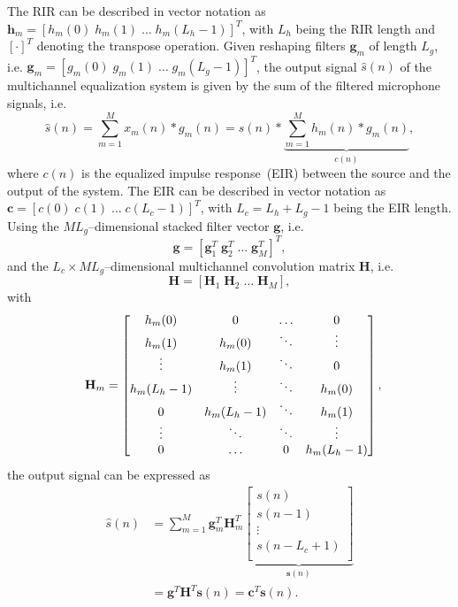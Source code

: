 \documentclass[10pt]{IEEEtran}
\begin{document}
The RIR can be described in vector notation as $\mathbf{h}_m = \left[h_m(0) \; h_m(1) \; \ldots \; h_m(L_h-1) \right]^T$, with $L_h$ being the RIR length and $\left[\cdot \right]^T$ denoting the transpose operation.
Given reshaping filters $\mathbf{g}_m$ of length $L_g$, i.e. $\mathbf{g}_m = \left[g_m(0) \; g_m(1) \; \ldots \; g_m(L_g-1) \right]^T$, the output signal $\hat{s}(n)$ of the multichannel equalization system is given by the sum of the filtered microphone signals, i.e.
\begin{equation}
  \hat{s}(n) = \sum_{m=1}^{M} x_m(n) \ast g_m(n) = s(n) \ast \underbrace{\sum_{m=1}^{M} h_m(n) \ast g_m(n)}_{c(n)},
\end{equation}
where $c(n)$ is the equalized impulse response~(EIR) between the source and the output of the system.
The EIR can be described in vector notation as $\mathbf{c} = \left[c(0) \; c(1) \; \ldots \; c(L_c-1) \right]^{T}$, with $L_c = L_h+L_g-1$ being the EIR length.
Using the $ML_g$--dimensional stacked filter vector $\mathbf{g}$, i.e.
\begin{equation}
  \mathbf{g}  =  \left[\mathbf{g}_1^T \; \mathbf{g}_2^T \; \ldots \; \mathbf{g}_M^T \right]^T,
\end{equation}
 and the $L_c \times ML_g$--dimensional multichannel convolution matrix $\mathbf{H}$, i.e.
\begin{equation}
\mathbf{H}  = \left[\mathbf{H}_1 \; \mathbf{H}_2 \; \ldots \; \mathbf{H}_M \right],
\end{equation}
with
\begin{equation}
\hspace{-0.2cm}
\mathbf{H}_m =  \begin{bmatrix}
    h_m(0) & 0 &  \ldots & 0 \\
    h_m(1) & h_m(0) & \ddots & \vdots \\
    \vdots & h_m(1) & \ddots & 0 \\
    h_m(L_h-1) & \vdots & \ddots & h_m(0) \\
    0 & h_m(L_h-1) & \ddots & h_m(1) \\
    \vdots & \ddots & \ddots & \vdots \\
    0 & \ldots & 0 & h_m(L_h-1)
   \end{bmatrix},\hspace{-0.4cm}
 \end{equation}
the output signal can be expressed as
\begin{align}
\hat{s}(n) &=  \sum_{m=1}^{M} \mathbf{g}_m^T
 \mathbf{H}_m^T
\underbrace{\left[
\begin{array}{c}
s(n) \\
s(n-1) \\
\vdots \\
s(n-L_c+1) \\
\end{array}
\right]}_{\mathbf{s}(n)}  \\
& =  \mathbf{g}^T \mathbf{H}^T \mathbf{s}(n)  =  \mathbf{c}^T \mathbf{s}(n).
\end{align}
\end{document}
